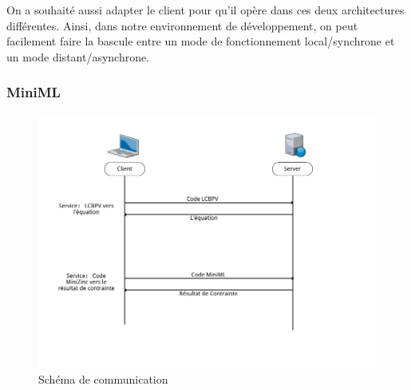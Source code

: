 \documentclass[12pt]{article}
\begin{document}
On a souhaité aussi adapter le client pour qu'il opère dans ces deux
architectures différentes. Ainsi, dans notre environnement de
développement, on peut facilement faire la bascule entre un mode de
fonctionnement local/synchrone et un mode distant/asynchrone.

\hypertarget{schuxe9ma-de-communication}{%
  \subsubsection{MiniML}\label{schuxe9ma-de-communication}}

\begin{figure}
  \centering
  \includegraphics{Figures/Communication.png}
  \caption{Schéma de communication}
\end{figure}

\newpage
\end{document}
